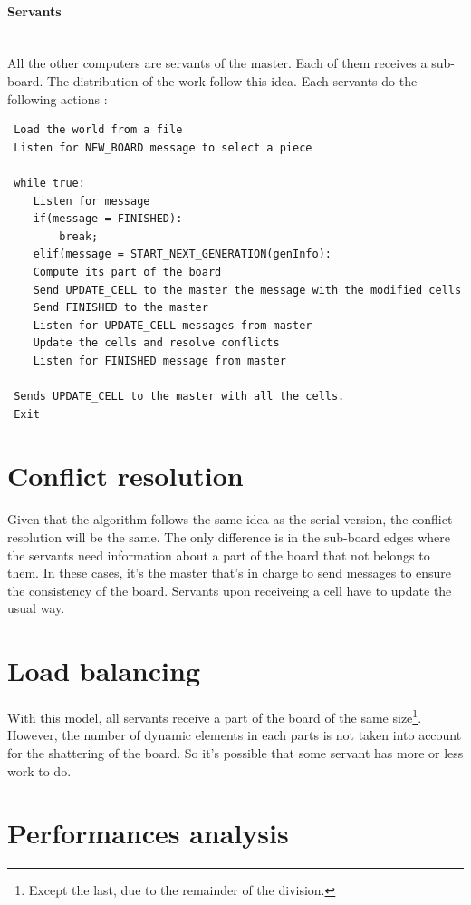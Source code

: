 \documentclass[a4paper,10pt]{article}
\begin{document}
\paragraph{Servants}
~\\

All the other computers are servants of the master. Each of them receives a sub-board. The distribution of the work follow this idea.
Each servants do the following actions :

\begin{lstlisting}
 Load the world from a file
 Listen for NEW_BOARD message to select a piece
 
 while true:
    Listen for message
    if(message = FINISHED):
		break;
    elif(message = START_NEXT_GENERATION(genInfo):
    Compute its part of the board
    Send UPDATE_CELL to the master the message with the modified cells
    Send FINISHED to the master
    Listen for UPDATE_CELL messages from master
    Update the cells and resolve conflicts
    Listen for FINISHED message from master
    
 Sends UPDATE_CELL to the master with all the cells.
 Exit
\end{lstlisting}

\section*{Conflict resolution}
Given that the algorithm follows the same idea as the serial version, the conflict resolution will be the same. 
The only difference is in the sub-board edges where the servants need information about a part of the board that not belongs to them.
In these cases, it's the master that's in charge to send messages to ensure the consistency of the board. Servants upon receiveing a cell have to update the usual way.
\section*{Load balancing}
With this model, all servants receive a part of the board of the same size\footnote{Except the last, due to the remainder of the division.}.
However, the number of dynamic elements in each parts is not taken into account for the shattering of the board. So it's possible
that some servant has more or less work to do.
\section*{Performances analysis}
\end{document}
